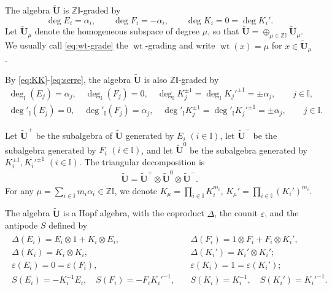 \documentclass[a4paper,reqno,12pt]{amsart}
\numberwithin{equation}{section}
\theoremstyle{definition}
\theoremstyle{plain}
\theoremstyle{definition}
\def\Z{\mathbb Z}
\def\I{\mathbb I}
\def\tU{\widetilde{\mathbf U}}
\newcommand{\wt}{\operatorname{wt}}
\begin{document}
	The algebra $\tU$ is $\Z\I$-graded by 
	\begin{equation}\label{eq:wt-grade}
	   \deg E_i=\alpha_i, \qquad\deg F_i=-\alpha_i,\qquad \deg K_i=0=\deg K_i'. 
	\end{equation} 
	Let $\tU_\mu$ denote the homogeneous subspace of degree $\mu$, so that $\tU=\oplus_{\mu\in\Z\I} \tU_\mu$. We usually call \eqref{eq:wt-grade} the $\wt$-grading and write $\wt(x)=\mu$ for $x\in\tU_\mu$.

    By \eqref{eq:KK}-\eqref{eq:serre}, the algebra $\tU$ is also $\Z\I$-graded by
    \begin{align}
      \deg_\I(E_j)=\alpha_j,\quad\deg_\I(F_j)=0,\quad\deg_\I K_j^{\pm1}=\deg_\I K_j'^{\pm1}=\pm\alpha_j,\qquad j\in\I,\label{eq:ZI-grade-1}\\
      \deg'_\I(E_j)=0,\quad\deg'_\I(F_j)=\alpha_j,\quad\deg'_\I K_j^{\pm1}=\deg'_\I K_j'^{\pm1}=\pm\alpha_j,\qquad j\in\I\label{eq:ZI-grade-2}.
    \end{align}

    Let $\tU^+$ be the subalgebra of $\tU$ generated by $E_i$ $(i\in \I)$, let $\tU^-$ be the subalgebra generated by $F_i$ $(i\in\I)$, and let $\tU^0$ be the subalgebra generated by $K_i^{\pm 1},K_i'^{\pm 1}$ $(i\in \I)$. The triangular decomposition is
	\begin{align*} 
		\tU =\tU^+\otimes \tU^0\otimes\tU^-.
	\end{align*}
    For any $\mu=\sum_{i\in\I}m_i\alpha_i\in\Z\I$, we denote $K_\mu=\prod_{i\in\I} K_i^{m_i}$, $K_\mu'=\prod_{i\in\I} (K_i')^{m_i}$.
    

    The algebra $\tU$ is a Hopf algebra, with the coproduct $\Delta$, the counit $\varepsilon$, and the antipode $S$ defined by
	\begin{align}\label{eq:Hopf structure of tU}
		\begin{split}
			\Delta(E_i)=E_i\otimes 1+K_i\otimes E_i,\quad &\Delta(F_i)=1\otimes F_i+F_i\otimes K_i',
			\\
			\Delta(K_i)=K_i\otimes K_i,\quad &\Delta(K_i')=K_i'\otimes K_i';
			\\
			\varepsilon(E_i)=0=\varepsilon(F_i),\qquad &\varepsilon(K_i)=1=\varepsilon(K_i');
			\\
			S(E_i)=-K_i^{-1}E_i,\quad S(F_i)=-F_iK_i'^{-1},\quad &S(K_i)=K_i^{-1},\quad S(K_i')=K_i'^{-1}.
		\end{split}
	\end{align}
\end{document}
